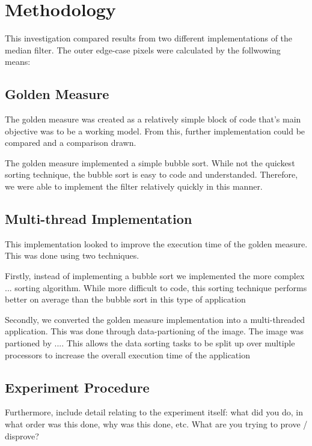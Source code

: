 \section{Methodology}
This investigation compared results from two different implementations of the median filter. The outer edge-case pixels were calculated by the follwowing means:

\subsection{Golden Measure}
The golden measure was created as a relatively simple block of code that's main objective was to be a working model. From this, further implementation could be compared and a comparison drawn.

The golden measure implemented a simple bubble sort. While not the quickest sorting technique, the bubble sort is easy to code and understanded. Therefore, we were able to implement the filter relatively quickly in this manner.

\subsection{Multi-thread Implementation}
This implementation looked to improve the execution time of the golden measure. This was done using two techniques. 

Firstly, instead of implementing a bubble sort we implemented the more complex ... sorting algorithm. While more difficult to code, this sorting technique performs better on average than the bubble sort in this type of application

Secondly, we converted the golden measure implementation into a multi-threaded application. This was done through data-partioning of the image. The image was partioned by .... This allows the data sorting tasks to be split up over multiple processors to increase the overall execution time of the application

  
\subsection{Experiment Procedure}
Furthermore, include detail relating to the experiment itself: what did you do, in what order was this done, why was this done, etc.  What are you trying to prove / disprove?